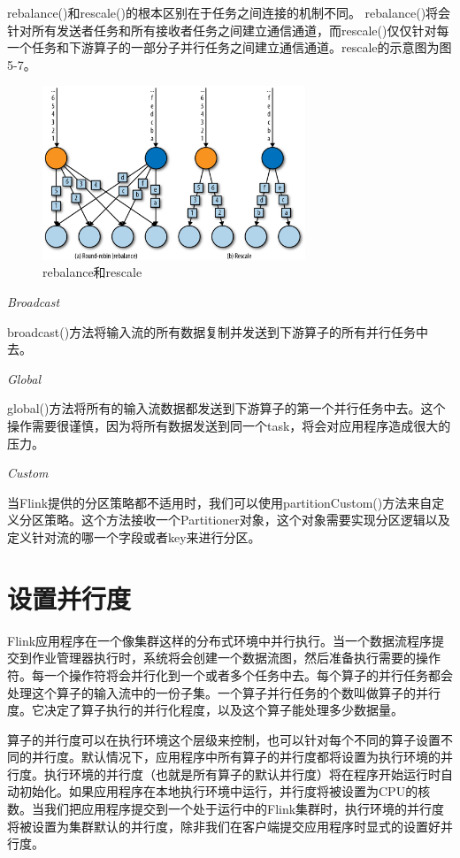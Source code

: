 \documentclass[cn,11pt,chinese]{elegantbook}
\begin{document}
rebalance()和rescale()的根本区别在于任务之间连接的机制不同。 rebalance()将会针对所有发送者任务和所有接收者任务之间建立通信通道，而rescale()仅仅针对每一个任务和下游算子的一部分子并行任务之间建立通信通道。rescale的示意图为图5-7。

\begin{figure}[htbp]
    \centering
    \includegraphics[width=0.7\textwidth]{images/spaf_0507.png}
    \caption{rebalance和rescale}
\end{figure}

\textit{Broadcast}

broadcast()方法将输入流的所有数据复制并发送到下游算子的所有并行任务中去。

\textit{Global}

global()方法将所有的输入流数据都发送到下游算子的第一个并行任务中去。这个操作需要很谨慎，因为将所有数据发送到同一个task，将会对应用程序造成很大的压力。

\textit{Custom}

当Flink提供的分区策略都不适用时，我们可以使用partitionCustom()方法来自定义分区策略。这个方法接收一个Partitioner对象，这个对象需要实现分区逻辑以及定义针对流的哪一个字段或者key来进行分区。

\section{设置并行度}

Flink应用程序在一个像集群这样的分布式环境中并行执行。当一个数据流程序提交到作业管理器执行时，系统将会创建一个数据流图，然后准备执行需要的操作符。每一个操作符将会并行化到一个或者多个任务中去。每个算子的并行任务都会处理这个算子的输入流中的一份子集。一个算子并行任务的个数叫做算子的并行度。它决定了算子执行的并行化程度，以及这个算子能处理多少数据量。

算子的并行度可以在执行环境这个层级来控制，也可以针对每个不同的算子设置不同的并行度。默认情况下，应用程序中所有算子的并行度都将设置为执行环境的并行度。执行环境的并行度（也就是所有算子的默认并行度）将在程序开始运行时自动初始化。如果应用程序在本地执行环境中运行，并行度将被设置为CPU的核数。当我们把应用程序提交到一个处于运行中的Flink集群时，执行环境的并行度将被设置为集群默认的并行度，除非我们在客户端提交应用程序时显式的设置好并行度。
\end{document}
